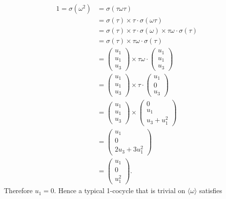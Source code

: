 \begin{align*}
	1 = \sigma(\omega^2) &= \sigma(\tau\omega\tau) \\
	&= \sigma(\tau) \times \tau\cdot\sigma(\omega\tau)\\
	&= \sigma(\tau) \times \tau\cdot\sigma(\omega) \times \tau\omega\cdot\sigma(\tau) \\
	&= \sigma(\tau) \times \tau\omega\cdot\sigma(\tau) \\
	&= \left(\begin{matrix} u_1 \\ u_1 \\ u_3\end{matrix} \right) \times
	\tau\omega\cdot\left(\begin{matrix} u_1 \\ u_1 \\ u_3\end{matrix} \right)\\
	&= \left(\begin{matrix} u_1 \\ u_1 \\ u_3\end{matrix} \right) \times
	\tau\cdot\left(\begin{matrix} u_1 \\ 0 \\ u_3\end{matrix} \right)\\
	&= \left(\begin{matrix} u_1 \\ u_1 \\ u_3\end{matrix} \right) \times
	\left(\begin{matrix} 0 \\ u_1 \\ u_3 + u_1^2\end{matrix} \right)\\
	&= \left(\begin{matrix} u_1 \\ 0 \\ 2u_3 + 3u_1^2\end{matrix} \right)\\
	&= \left(\begin{matrix} u_1 \\ 0 \\ u_1^2\end{matrix} \right).
\end{align*}
Therefore $u_1 = 0$. Hence a typical 1-cocycle that is trivial on $\langle \omega \rangle$ satisfies
